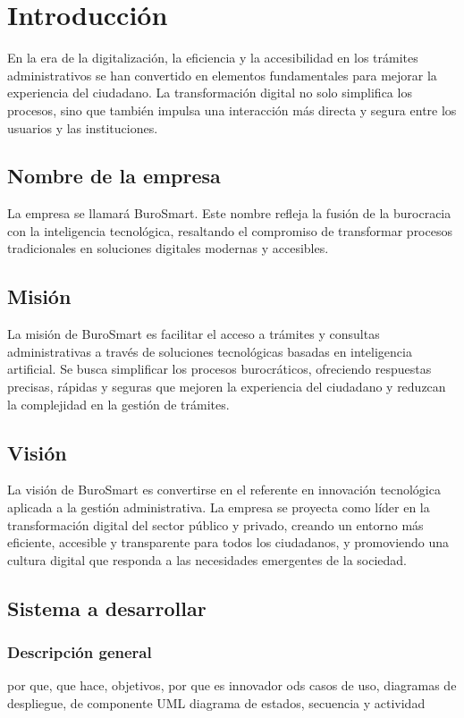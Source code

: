 \section{Introducción}
En la era de la digitalización, la eficiencia y la accesibilidad en los trámites administrativos se han convertido en elementos fundamentales para mejorar la experiencia del ciudadano. La transformación digital no solo simplifica los procesos, sino que también impulsa una interacción más directa y segura entre los usuarios y las instituciones.


\subsection{Nombre de la empresa}
La empresa se llamará BuroSmart. Este nombre refleja la fusión de la burocracia con la inteligencia tecnológica, resaltando el compromiso de transformar procesos tradicionales en soluciones digitales modernas y accesibles.

\subsection{Misión}
La misión de BuroSmart es facilitar el acceso a trámites y consultas administrativas a través de soluciones tecnológicas basadas en inteligencia artificial. Se busca simplificar los procesos burocráticos, ofreciendo respuestas precisas, rápidas y seguras que mejoren la experiencia del ciudadano y reduzcan la complejidad en la gestión de trámites.

\subsection{Visión}
La visión de BuroSmart es convertirse en el referente en innovación tecnológica aplicada a la gestión administrativa. La empresa se proyecta como líder en la transformación digital del sector público y privado, creando un entorno más eficiente, accesible y transparente para todos los ciudadanos, y promoviendo una cultura digital que responda a las necesidades emergentes de la sociedad.


\subsection{Sistema a desarrollar}

\subsubsection{Descripción general}
por que, que hace, objetivos, por que es innovador
ods
casos de uso, diagramas de despliegue, de componente
UML diagrama de estados, secuencia y actividad

